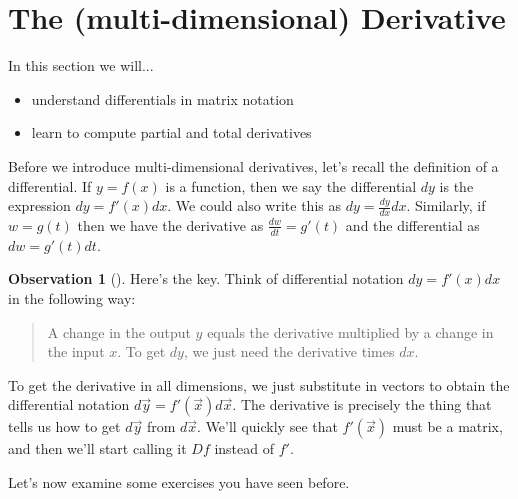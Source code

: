\documentclass[10pt,]{book}
\theoremstyle{plain}
\theoremstyle{definition}
\theoremstyle{definition}
\newtheorem{observation}[theorem]{Observation}
\theoremstyle{definition}
\theoremstyle{definition}
\theoremstyle{definition}
\numberwithin{equation}{section}
\begin{document}
\section[{The (multi-dimensional) Derivative}]{The (multi-dimensional) Derivative}\label{section-21}
In this section we will... \leavevmode%
\begin{itemize}[label=\textbullet]
\item{}understand differentials in matrix notation%
\item{}learn to compute partial and total derivatives%
\end{itemize}
%
\par
Before we introduce multi-dimensional derivatives, let's recall the definition of a differential. If \(y=f(x)\) is a function, then we say the differential \(dy\) is the expression \(dy=f'(x) dx\). We could also write this as \(dy = \frac{dy}{dx}dx\). Similarly, if \(w=g(t)\) then we have the derivative as \(\frac{dw}{dt}=g'(t)\) and the differential as \(dw=g'(t)dt\).%
\begin{observation}[]\label{observation-1}
Here's the key. Think of differential notation \(dy=f'(x)dx\) in the following way:%
\begin{quote}\hypertarget{blockquote-2}{}
A change in the output \(y\) equals the derivative multiplied by  a change in the input \(x\). To get \(dy\), we just need the derivative times \(dx\).\end{quote}
To get the derivative in all dimensions, we just substitute in vectors to obtain the differential notation \(d\vec y = f'(\vec x) d\vec x\). The derivative is precisely the thing that tells us how to get \(d\vec y\) from \(d\vec x\). We'll quickly see that \(f'(\vec x)\) must be a matrix, and then we'll start calling it \(Df\) instead of \(f'\).%
\end{observation}
Let's now examine some exercises you have seen before.%
\end{document}
